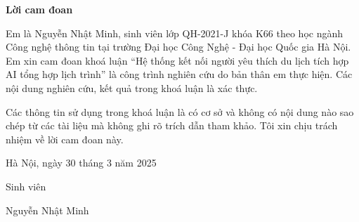 \setcounter{page}{1}
\begin{center}
\textbf{\large{Lời cam đoan}	}
\end{center}
Em là Nguyễn Nhật Minh, sinh viên lớp QH-2021-J khóa K66 theo học ngành Công nghệ thông tin tại trường Đại học Công Nghệ - Đại học Quốc gia Hà Nội. Em xin cam đoan khoá luận ``Hệ thống kết nối người yêu thích du lịch tích hợp AI tổng hợp lịch trình'' là công trình nghiên cứu do bản thân em thực hiện. Các nội dung nghiên cứu, kết quả trong khoá luận là xác thực.

Các thông tin sử dụng trong khoá luận là có cơ sở và không có nội dung nào sao chép từ các tài liệu mà không ghi rõ trích dẫn tham khảo. Tôi xin chịu trách nhiệm về lời cam đoan này.

\begin{flushright}
Hà Nội, ngày 30 tháng 3 năm 2025
\end{flushright}

\begin{changemargin}{12cm}{2cm}
Sinh viên
\\[2cm]
\end{changemargin}

\begin{changemargin}{11cm}{1cm}
Nguyễn Nhật Minh
\end{changemargin}